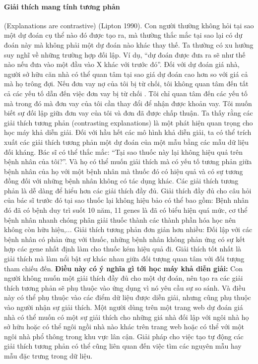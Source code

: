 \paragraph{Giải thích mang tính tương phản} (Explanations are contrastive) (Lipton 1990). Con người thường không hỏi tại sao một dự đoán cụ thể nào đó được tạo ra, mà thường thắc mắc tại sao lại có dự đoán này mà không phải một dự đoán nào khác thay thế. Ta thường có xu hướng suy nghĩ về những trường hợp đối lập. Ví dụ, ``dự đoán được đưa ra sẽ như thế nào nếu đưa vào một đầu vào X khác với trước đó''. Đối với dự đoán giá nhà, người sở hữu căn nhà có thể quan tâm tại sao giá dự đoán cao hơn so với giá cả mà họ trông đợi. Nếu đơn vay nợ của tôi bị từ chối, tôi không quan tâm đến tất cả các yếu tố dẫn đến việc đơn vay bị từ chối . Tôi chỉ quan tâm đến các yếu tố mà trong đó mà đơn vay của tôi cần thay đổi để nhận được khoản vay. Tôi muốn biết sự đối lập giữa đơn vay của tôi và đơn đã được chấp thuận. Ta thấy rằng các giải thích tương phản (contrasting explanations) là một phát hiện quan trọng cho học máy khả diễn giải. Đối với hầu hết các mô hình khả diễn giải, ta có thể trích xuất các giải thích tương phản một dự đoán của một mẫu bằng các mẫu dữ liệu đối kháng. Bác sĩ có thể thắc mắc: ``Tại sao thuốc này lại không hiệu quả trên bệnh nhân của tôi?''. Và họ có thể muốn giải thích mà có yếu tố tương phản giữa bệnh nhân của họ với một bệnh nhân mà thuốc đó có hiệu quả và có sự tương đồng đối với những bệnh nhân không có tác dụng khác. Các giải thích tương phản là dễ dàng để hiểu hơn các giải thích đầy đủ. Giải thích đầy đủ cho câu hỏi của bác sĩ trước đó tại sao thuốc lại không hiệu bảo có thể bao gồm: Bệnh nhân đó đã có bệnh duy trì suốt 10 năm, 11 genes là đã có biểu hiện quá mức, cơ thể bệnh nhân nhanh chóng phân giải thuốc thành các thành phần hóa học nên không còn hữu hiệu,... Giải thích tương phản đơn giản hơn nhiều: Đối lập với các bệnh nhân có phản ứng với thuốc, những bệnh nhân không phản ứng có sự kết hợp các gene nhất định làm cho thuốc kém hiệu quả đi. Giải thích tốt nhất là giải thích mà làm nổi bật sự khác nhau giữa đối tượng quan tâm với đối tượng tham chiếu đến.
\textbf{Điều này có ý nghĩa gì tới học máy khả diễn giải:} Con người không muốn một giải thích đầy đủ cho một dự đoán, nên tạo ra các giải thích tương phản sẽ phụ thuộc vào ứng dụng vì nó yêu cầu sự so sánh. Và điều này có thể phụ thuộc vào các điểm dữ liệu được diễn giải, nhưng cũng phụ thuộc vào người nhận sự giải thích. Một người dùng trên một trang web dự đoán giá nhà có thể muốn có một sự giải thích cho những giá nhà đối lập với ngôi nhà họ sở hữu hoặc có thể ngôi ngồi nhà nào khác trên trang web hoặc có thể với một ngôi nhà phổ thông trong khu vực lân cận. Giải pháp cho việc tạo tự động các giải thích tương phản có thể cũng liên quan đến việc tìm các nguyên mẫu hay mẫu đặc trưng trong dữ liệu.

